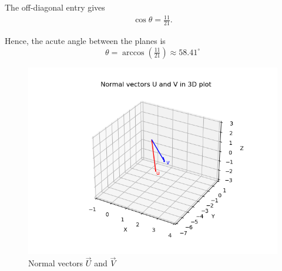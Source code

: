 \documentclass[12pt]{article}
\begin{document}
The off-diagonal entry gives
\begin{align}
\cos\theta = \frac{11}{21}.
\end{align}

Hence, the acute angle between the planes is
\[
\boxed{\theta = \arccos\!\left(\tfrac{11}{21}\right) \approx 58.41^\circ}
\]

\begin{figure}[H]\centering
\includegraphics[width=1\columnwidth]{figs/plt.png}
\caption{Normal vectors $\vec{U}$ and $\vec{V}$}
\label{fig:plt}
\end{figure}
\end{document}
